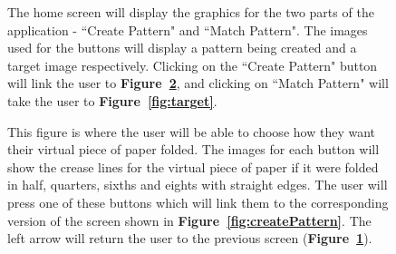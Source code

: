 \documentclass[11pt]{article}
\begin{document}
\begin{figure}
\begin{minipage}[c]{0.35\textwidth}
                \end{minipage}\hfill
                \begin{minipage}[c]{0.65\textwidth}
                \caption{The home screen will display the graphics for the two parts of the application - ``Create Pattern" and ``Match Pattern". The images used for the buttons will display a pattern being created and a target image respectively. Clicking on the ``Create Pattern" button will link the user to \textbf{Figure~\ref{fig:chooseFold}}, and clicking on ``Match Pattern" will take the user to \textbf{Figure~\ref{fig:target}}.}
                \label{fig:homeScreen}
                \end{minipage}
            \end{figure}
            \begin{figure}
                \begin{minipage}[c]{0.65\textwidth}
                \caption{This figure is where the user will be able to choose how they want their virtual piece of paper folded. The images for each button will show the crease lines for the virtual piece of paper if it were folded in half, quarters, sixths and eights with straight edges. The user will press one of these buttons which will link them to the corresponding version of the screen shown in \textbf{Figure~\ref{fig:createPattern}}. The left arrow will return the user to the previous screen (\textbf{Figure~\ref{fig:homeScreen}}).}
                \label{fig:chooseFold}
                \end{minipage}\hfill
                \begin{minipage}[c]{0.35\textwidth}

\end{minipage}
\end{figure}
\end{document}
